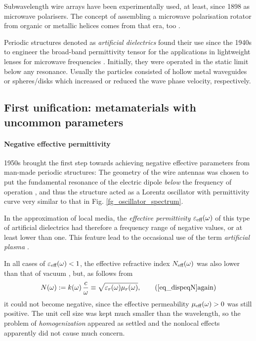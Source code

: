 Subwavelength wire arrays have been experimentally used, at least, since 1898 as microwave polarisers. The concept of assembling a microwave polarisation rotator from organic or metallic helices comes from that era, too \cite{bose1898rotation, emerson}.

Periodic structures denoted as \textit{artificial dielectrics} \cite{brown1955properties} found their use since the 1940s to engineer the broad-band permittivity tensor for the applications in lightweight lenses for microwave frequencies \cite{kock1948metallic}. Initially, they were operated in the static limit below any resonance. Usually the particles consisted of hollow metal waveguides or spheres/disks which increased or reduced the wave phase velocity, respectively. 


\subsection{First unification: metamaterials with uncommon parameters} 
\paragraph{Negative effective permittivity} %
1950s brought the first step towards achieving negative effective parameters from man-made periodic structures: The geometry of the wire antennas was chosen to put the fundamental resonance of the electric dipole \textit{below} the frequency of operation \cite{rotman1962plasma,boardman2005negative}, and thus the structure acted as a Lorentz oscillator with permittivity curve very similar to that in Fig. \ref{fg_oscillator_spectrum}. 

In the approximation of local media, the \textit{effective permittivity} $\varepsilon_{\text{eff} }(\omega)$ of this type of artificial dielectrics had therefore a frequency range of negative values, or at least lower than one. This feature lead to the occasional use of the term \textit{artificial plasma} \cite{merkel1973simulation}. 

In all cases of $\varepsilon_{\text{eff} }(\omega)<1$, the effective refractive index $N_{\text{eff} }(\omega)$ was also lower than that of vacuum \cite{brown1953artificial}, but, as follows from
\begin{equation} N(\omega) := k(\omega) \, \frac{c}{\omega} \equiv \sqrt{\epsrl(\omega)\murl(\omega)}, \tag{\ref{eq_dispeqN}\again} \end{equation}
it could not become negative, since the effective permeability $\mu_{\text{eff} }(\omega) > 0$ was still positive. The unit cell size was kept much smaller than the wavelength, so the problem of \textit{homogenization} appeared as settled and the nonlocal effects apparently did not cause much concern.

